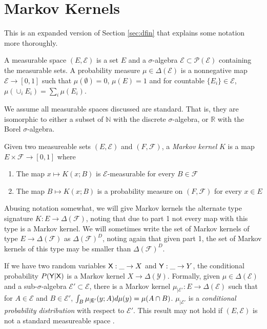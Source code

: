\section{Markov Kernels}\label{app:markov_kernels}

This is an expanded version of Section \ref{sec:dfin} that explains some notation more thoroughly.

A measurable space $(E,\mathcal{E})$ is a set $E$ and a $\sigma$-algebra $\mathcal{E}\subset\mathcal{P}(\mathcal{E})$ containing the measurable sets. A probability measure $\mu\in \Delta(\mathcal{E})$ is a nonnegative map $\mathcal{E}\to[0,1]$ such that $\mu(\emptyset)=0$, $\mu(E)=1$ and for countable $\{E_i\}\in \mathcal{E}$, $\mu(\cup_i E_i) = \sum_i \mu(E_i)$.

We assume all measurable spaces discussed are standard. That is, they are isomorphic to either a subset of $\mathbb{N}$ with the discrete $\sigma$-algebra, or $\mathbb{R}$ with the Borel $\sigma$-algebra.

Given two measureable sets $(E,\mathcal{E})$ and $(F,\mathcal{F})$, a \emph{Markov kernel} $K$ is a map $E\times \mathcal{F} \to [0,1]$ where
\begin{enumerate}
    \item The map $x\mapsto K(x;B)$ is $\mathcal{E}$-measurable for every $B\in\mathcal{F}$
    \item The map $B\mapsto K(x;B)$ is a probability measure on $(F,\mathcal{F})$ for every $x\in E$ 
\end{enumerate}

Abusing notation somewhat, we will give Markov kernels the alternate type signature $K:E\to \Delta(\mathcal{F})$, noting that due to part 1 not every map with this type is a Markov kernel. We will sometimes write the set of Markov kernels of type $E\to \Delta(\mathcal{F})$ as $\Delta(\mathcal{F})^D$, noting again that given part 1, the set of Markov kernels of this type may be smaller than $\Delta(\mathcal{F})^D$.

If we have two random variables $\mathsf{X}:\_\to X$ and $\mathsf{Y}:\_\to Y$, the conditional probability $P(\mathsf{Y}|\mathsf{X})$ is a Markov kernel $X\to \Delta(\mathcal{Y})$. Formally, given $\mu\in \Delta(\mathcal{E})$ and a sub-$\sigma$-algebra $\mathcal{E}'\subset\mathcal{E}$, there is a Markov kernel $\mu_{|\mathcal{E}'}:E\to\Delta(\mathcal{E})$ such that for $A\in\mathcal{E}$ and $B\in \mathcal{E}'$, $\int_B \mu_{|\mathsf{E}'}(y;A) d\mu(y) = \mu(A\cap B)$. $\mu_{|\mathcal{E}'}$ is a \emph{conditional probability distribution} with respect to $\mathcal{E}'$. This result may not hold if $(E,\mathcal{E})$ is not a standard measureable space \citep{cinlar_probability_2011}.

